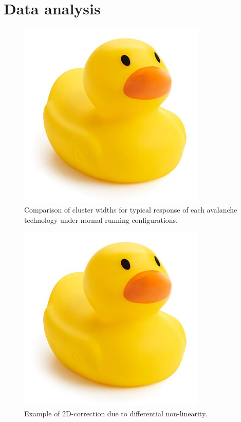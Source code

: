 \documentclass{article}
\begin{document}
\section{Data analysis}
\begin{figure}
  \includegraphics[width=0.8\textwidth]{fig/temp.jpg}
  \caption{Comparison of cluster widths for typical response of each avalanche technology under normal running configurations.}
\end{figure}
\begin{figure}
  \includegraphics[width=0.8\textwidth]{fig/temp.jpg}
  \caption{Example of 2D-correction due to differential non-linearity.}
\end{figure}
\end{document}
